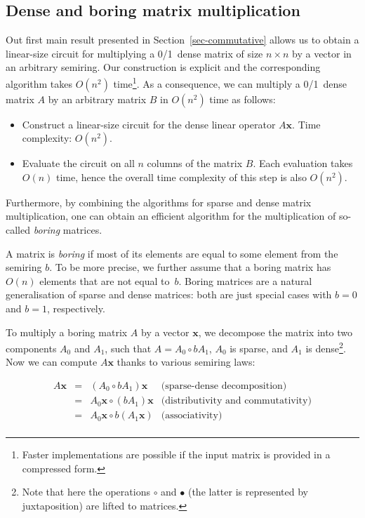 \documentclass[11pt,letterpaper]{article}
\begin{document}
\subsection{Dense and boring matrix multiplication}\label{sec-boring-matrices}

Out first main result presented in Section~\ref{sec-commutative} allows us to
obtain a linear-size circuit for multiplying a 0/1~dense matrix of size
$n \times n$ by a vector in an arbitrary semiring. Our construction is explicit
and the corresponding algorithm takes $O(n^2)$ time\footnote{Faster
implementations are possible if the input matrix is provided in a compressed
form.}. As a consequence, we can multiply a 0/1~dense matrix $A$ by an arbitrary
matrix $B$ in $O(n^2)$ time as follows:

\begin{itemize}
  \item Construct a linear-size circuit for the dense linear operator
  $A\mathbf{x}$. Time complexity: $O(n^2)$.
  \item Evaluate the circuit on all $n$ columns of the matrix $B$. Each
  evaluation takes $O(n)$ time, hence the overall time complexity of this step
  is also $O(n^2)$.
\end{itemize}

Furthermore, by combining the algorithms for sparse and dense matrix
multiplication, one can obtain an efficient algorithm for the multiplication of
so-called \emph{boring} matrices.

A matrix is \emph{boring} if most of its elements are equal to some element from
the semiring $b$. To be more precise, we further assume that a boring matrix has
$O(n)$ elements that are not equal to~$b$. Boring matrices are a natural
generalisation of sparse and dense matrices: both are just special cases with
$b=0$ and $b=1$, respectively.

To multiply a boring matrix $A$ by a vector $\mathbf{x}$, we decompose the
matrix into two components $A_0$ and $A_1$, such that $A = A_0 \circ b A_1$,
$A_0$ is sparse, and $A_1$ is dense\footnote{Note that here the operations
$\circ$ and $\bullet$ (the latter is represented by juxtaposition) are lifted to
matrices.}. Now we can compute $A \mathbf{x}$ thanks to various semiring laws:

\[
\begin{array}{rcll}
A \mathbf{x} & = & (A_0 \circ b A_1) \mathbf{x} & \text{(sparse-dense decomposition)}\\
 & = & A_0 \mathbf{x} \circ (b A_1) \mathbf{x} & \text{(distributivity and commutativity)}\\
 & = & A_0 \mathbf{x} \circ b (A_1 \mathbf{x}) & \text{(associativity)}\\
\end{array}
\]
\end{document}
